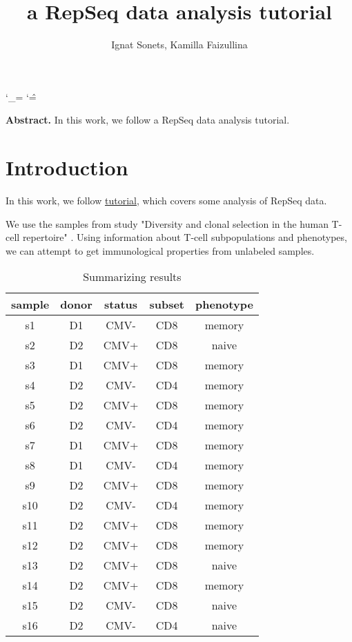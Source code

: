 \documentclass{article}
\title{a RepSeq data analysis tutorial }
\author{ Ignat Sonets, Kamilla Faizullina}
\date{\empty}
\begin{document}
 	
 	\catcode`\_=\active
 	\catcode`\^=\active
 	
 	\maketitle
 	
 	\textbf{Abstract.}  In this work, we follow a RepSeq data analysis tutorial.  
 	\section{Introduction}
In this work, we follow \href{https://github.com/antigenomics/repseq-annotation-tutorial}{tutorial}, which covers some analysis of RepSeq data.


We use the samples from study "Diversity and clonal selection in the human T-cell repertoire" \cite{pnas}. Using information about T-cell subpopulations and phenotypes, we can attempt to get immunological properties from unlabeled samples. 

 
   	\begin{table}[h]
 	\centering
 	\begin{tabular}{|c|c|c|c|c|}
 		\hline
 	sample &	donor &	status &	subset&	phenotype \\ \hline
 	s1	& D1	&	CMV-		& CD8 &	memory \\ \hline
 	s2	&D2		&CMV+	&	CD8	& naive \\ \hline
 	s3	&D1		&CMV+	&	CD8	& memory\\ \hline
 	s4	&D2		&CMV-	&	CD4	& memory\\ \hline
 	s5	&D2		&CMV+	&	CD8	& memory\\ \hline
 	s6	&D2		&CMV-	&	CD4	& memory\\ \hline
 	s7	&D1		&CMV+	&	CD8	& memory\\ \hline
 	s8	&D1		&CMV-	&	CD4	& memory\\ \hline
 	s9	&D2		&CMV+	&	CD8	& memory\\ \hline
 	s10	&D2		&CMV-	&	CD4	& memory\\ \hline		
 	s11	&D2		&CMV+	&	CD8	& memory\\ \hline
 	s12	&D2		&CMV+	&	CD8 &	memory\\ \hline
 	s13	&D2		&CMV+	&	CD8	&naive\\ \hline
 	s14	&D2		&CMV+	&	CD8	&memory\\ \hline
 	s15	&D2		&CMV-	&	CD8	&naive\\ \hline
 	s16&	D2	&	CMV-	&	CD4	&naive\\ \hline
 		
 		\hline	 
 		
 	\end{tabular}
  	\caption{ Summarizing results  }
  \label{tab:var}
\end{table}
\end{document}
